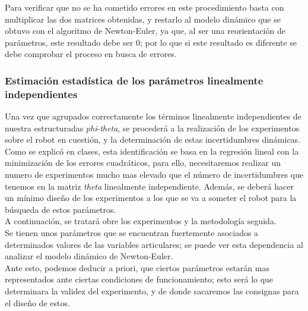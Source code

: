 Para verificar que no se ha cometido errores en este procedimiento basta con multiplicar las dos matrices obtenidas, y restarlo al modelo dinámico que se obtuvo con el algoritmo de Newton-Euler, ya que, al ser una reorientación de parámetros, este resultado debe ser 0; por lo que si este resultado es diferente se debe comprobar el proceso en busca de errores.

	\newpage
	\subsubsection{Estimación estadística de los parámetros linealmente independientes}
	Una vez que agrupados correctamente los términos linealmente independientes de nuestra estructuradas
	\textit{phi}-\textit{theta}, se procederá a la realización de los experimentos sobre
	el robot en cuestión, y la determinación de estas incertidumbres dinámicas.\\

	Como se explicó en clases, esta identificación se basa en la regresión lineal con la minimización de los
	errores cuadráticos, para ello, necesitaremos realizar un numero de experimentos mucho mas elevado que el número
	de incertidumbres que tenemos en la matriz \textit{theta} linealmente independiente. Además, se deberá hacer
	un mínimo diseño de los experimentos a los que se va a someter el robot para la búsqueda de estos parámetros.\\

	A continuación, se tratará obre los experimentos y la metodología seguida.\\
	Se tienen unos parámetros que se encuentran fuertemente asociados a determinados valores de las variables articulares; se puede ver esta dependencia al analizar el modelo dinámico de Newton-Euler.\\
	Ante esto, podemos deducir a priori, que ciertos parámetros estarán mas representados ante ciertas condiciones de funcionamiento; esto será lo que determinara la validez del experimento, y de donde sacaremos las consignas para el diseño de estos.\\

